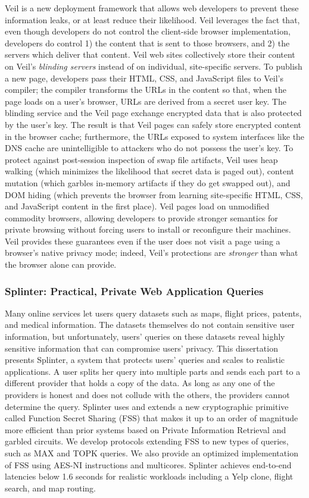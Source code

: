 Veil is a new deployment framework that allows
web developers to prevent these information leaks,
or at least reduce their likelihood. Veil leverages
the fact that, even though developers do not control the
client-side browser implementation, developers do
control 1) the content that is sent to those browsers,
and 2) the servers which deliver that content.
Veil web sites collectively store their content
on Veil's \emph{blinding servers} instead
of on individual, site-specific servers. To publish
a new page, developers pass their HTML, CSS, and
JavaScript files to Veil's compiler; the compiler
transforms the URLs in the content so that, when
the page loads on a user's browser, URLs are derived
from a secret user key. The blinding service and
the Veil page exchange encrypted
data that is also protected by the user's key. The
result is that Veil pages can safely store encrypted
content in the browser cache; furthermore, the URLs exposed
to system interfaces like the DNS cache are
unintelligible to attackers who do not possess
the user's key. To protect against post-session
inspection of swap file artifacts, Veil uses
heap walking (which minimizes the likelihood that
secret data is paged out), content mutation (which
garbles in-memory artifacts if they do get swapped out),
and DOM hiding (which prevents the browser from
learning site-specific HTML, CSS, and JavaScript
content in the first place). Veil pages load on unmodified
commodity browsers, allowing developers to provide
stronger semantics for private browsing without forcing
users to install or reconfigure their machines. Veil
provides these guarantees even if the user does not
visit a page using a browser's native privacy mode;
indeed, Veil's protections are \emph{stronger}
than what the browser alone can provide.

\subsubsection{Splinter: Practical, Private Web Application Queries}

Many online services let users query datasets such as maps, flight prices, patents,
and medical information. The datasets themselves do not contain sensitive user information,
but unfortunately, users' queries on these datasets reveal highly
sensitive information that can compromise users' privacy. 
This dissertation presents Splinter, a system that protects users' queries and
scales to realistic applications.
A user splits her query into multiple parts and sends each part 
to a different provider that holds a copy of the data.
As long as any one of the providers is honest and does not collude with the
others, the providers cannot determine the query.
Splinter uses and extends a new cryptographic primitive called Function Secret Sharing (FSS) that makes it up to an order of magnitude more efficient than prior systems based on Private Information Retrieval and garbled circuits.
We develop protocols extending FSS to new types of queries, such as MAX and TOPK queries. 
We also provide an optimized implementation of FSS using AES-NI instructions and multicores.
Splinter achieves end-to-end latencies below 1.6 seconds for realistic workloads including a Yelp clone, flight search, and map routing.

